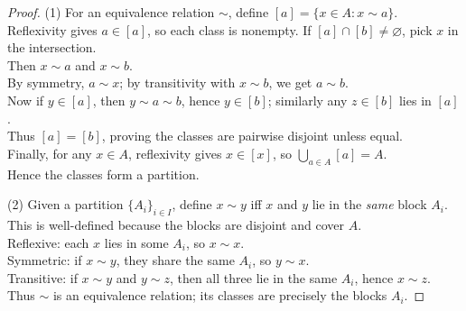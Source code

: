 \documentclass[12pt]{article}
\theoremstyle{definition}
\begin{document}
\begin{proof}

\noindent
(1) For an equivalence relation \(\sim\), define \([a]=\{x\in A: x\sim a\}\).\\

\noindent
Reflexivity gives \(a\in [a]\), so each class is nonempty.
If \([a]\cap [b]\neq\varnothing\), pick \(x\) in the intersection.\\

\noindent
Then \(x\sim a\) and \(x\sim b\).\\

\noindent
By symmetry, \(a\sim x\); by transitivity with \(x\sim b\), we get \(a\sim b\).\\

\noindent
Now if \(y\in [a]\), then \(y\sim a\sim b\), hence \(y\in [b]\); similarly any \(z\in [b]\) lies in \([a]\).\\

\noindent
Thus \([a]=[b]\), proving the classes are pairwise disjoint unless equal.\\

\noindent
Finally, for any \(x\in A\), reflexivity gives \(x\in [x]\), so \(\bigcup_{a\in A}[a]=A\).\\

\noindent
Hence the classes form a partition.\\

\dotfill

\noindent
(2) Given a partition \(\{A_i\}_{i\in I}\), define \(x\sim y\) iff \(x\) and \(y\) lie in the \emph{same} block \(A_i\).\\

\noindent
This is well-defined because the blocks are disjoint and cover \(A\).\\

\noindent
Reflexive: each \(x\) lies in some \(A_i\), so \(x\sim x\).\\

\noindent
Symmetric: if \(x\sim y\), they share the same \(A_i\), so \(y\sim x\).\\

\noindent
Transitive: if \(x\sim y\) and \(y\sim z\), then all three lie in the same \(A_i\), hence \(x\sim z\).\\

\noindent
Thus \(\sim\) is an equivalence relation; its classes are precisely the blocks \(A_i\).
\end{proof}

\newpage
\end{document}
